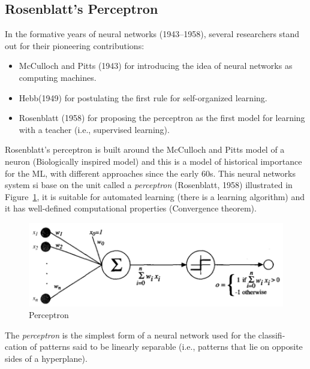 \documentclass[../main.tex]{subfiles}
\begin{document}
\subsection{Rosenblatt’s Perceptron}
In the formative years of neural networks (1943–1958), several researchers stand out for their pioneering contributions:
\begin{itemize}
    \item McCulloch and Pitts (1943) for introducing the idea of neural networks as computing machines.
    \item Hebb(1949) for postulating the first rule for self-organized learning.
    \item Rosenblatt (1958) for proposing the perceptron as the first model for learning with a teacher (i.e., supervised learning).
\end{itemize}

Rosenblatt’s perceptron is built around the McCulloch and Pitts model of a neuron (Biologically inspired model) and this is a model of historical importance for the ML, with different approaches since the early 60s.
This neural networks system si base on the unit called a \emph{perceptron} (Rosenblatt, 1958) illustrated in Figure~\ref{fig:perceptron}, it is suitable for automated learning (there is a learning algorithm) and it has well-defined computational properties (Convergence theorem).
\begin{figure}[H]
    \centering
    \includegraphics[scale = 0.35]{lectures/4_neural_networks/4_perceptron.png}
    \caption{Perceptron}
    \label{fig:perceptron}
\end{figure}
The \emph{perceptron} is the simplest form of a neural network used for the classifi- cation of patterns said to be linearly separable (i.e., patterns that lie on opposite sides of a hyperplane).
\end{document}
